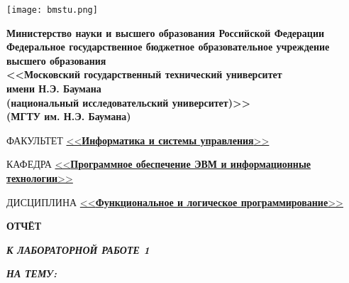 \begin{titlepage}
	\noindent\begin{minipage}{0.05\textwidth}
		\texttt{[image: bmstu.png]}
	\end{minipage}
	\hfill
	\begin{minipage}{0.85\textwidth}\raggedleft
		\begin{center}
			\fontsize{12pt}{0.3\baselineskip}\selectfont \textbf{Министерство науки и высшего образования Российской Федерации \\ Федеральное государственное бюджетное образовательное учреждение \\ высшего образования \\ <<Московский государственный технический университет \\ имени Н.Э. Баумана \\ (национальный исследовательский университет)>> \\ (МГТУ им. Н.Э. Баумана)}
		\end{center}
	\end{minipage}
	
	\begin{center}
		\fontsize{12pt}{0.1\baselineskip}\selectfont
		\noindent\makebox[\linewidth]{\rule{\textwidth}{4pt}} \makebox[\linewidth]{\rule{\textwidth}{1pt}}
	\end{center}
	
	\begin{flushleft}
		\fontsize{12pt}{0.8\baselineskip}\selectfont 
		
		ФАКУЛЬТЕТ \uline{<<\textbf{Информатика и системы управления}>> \hfill}
		
		КАФЕДРА \uline{<<\textbf{Программное обеспечение ЭВМ и информационные технологии}>> \hfill}
		
		ДИСЦИПЛИНА \uline{<<\textbf{Функциональное и логическое программирование}>> \hfill}
	\end{flushleft}
	
	\vfill
	
	\begin{center}
		\fontsize{18pt}{\baselineskip}\selectfont
		
		\textbf{ОТЧЁТ}
		
		\textbf{\textit{К ЛАБОРАТОРНОЙ РАБОТЕ 1}}
		
		\textbf{\textit{НА ТЕМУ:}}
	\end{center}
	
	\begin{center}
		\fontsize{18pt}{0.6cm}\selectfont 
		

\end{center}
\end{titlepage}
